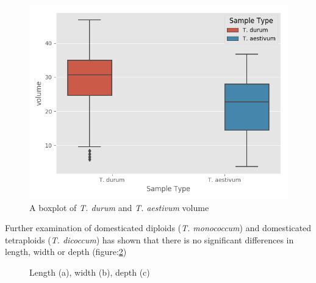 \documentclass[11pt]{report}
\begin{document}
\begin{figure}[htbp]
\centering
\includegraphics[width=12cm]{./images/results/group7/volume.png}
\caption{\label{fig:orge7fa60e}
A boxplot of \emph{T. durum} and \emph{T. aestivum} volume}
\end{figure}

Further examination of domesticated diploids (\emph{T. monococcum}) and domesticated tetraploids (\emph{T. dicoccum}) has shown that there is no significant differences in length, width or depth (figure:\ref{fig:widthdpethlength})

\begin{figure}[htbp]
  \hfill
  \hfill
  \caption{Length (a), width (b), depth (c) }
  \label{fig:widthdpethlength}
\end{figure}
\end{document}
